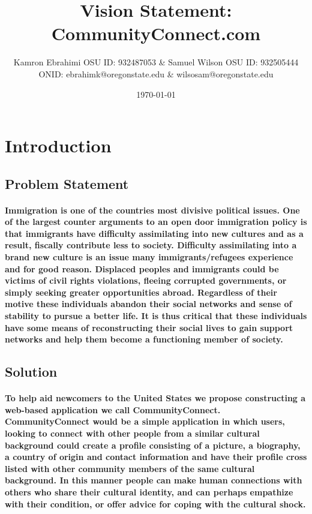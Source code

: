 \documentclass[12pt]{article}
\title{Vision Statement: CommunityConnect.com}
\author{Kamron Ebrahimi OSU ID: 932487053 \& Samuel Wilson OSU ID: 932505444\\ ONID: ebrahimk@oregonstate.edu \& wilsosam@oregonstate.edu}
\date{\today}
\begin{document}
\maketitle

\tableofcontents

\section{\bf Introduction}
        \subsection{\bf Problem Statement}
                \paragraph{\normalfont \indent Immigration is one of the countries most divisive political issues. One of the largest counter arguments to an open door immigration policy is that immigrants have difficulty assimilating into new cultures and as a result, fiscally contribute less to society. Difficulty assimilating into a brand new culture is an issue many immigrants/refugees experience and for good reason. Displaced peoples and immigrants could be victims of civil rights violations, fleeing corrupted governments, or simply seeking greater opportunities abroad. Regardless of their motive these individuals abandon their social networks and sense of stability to pursue a better life. It is thus critical that these individuals have some means of reconstructing their social lives to gain support networks and help them become a functioning member of society.
}
        \subsection{\bf Solution}
                \paragraph{\normalfont \indent To help aid newcomers to the United States we propose constructing a web-based application we call CommunityConnect. CommunityConnect would be a simple application in which users, looking to connect with other people from a similar cultural background could create a profile consisting of a picture, a biography, a country of origin and contact information and have their profile cross listed with other community members of the same cultural background. In this manner people can make human connections with others who share their cultural identity, and can perhaps empathize with their condition, or offer advice for coping with the cultural shock.}
\end{document}
